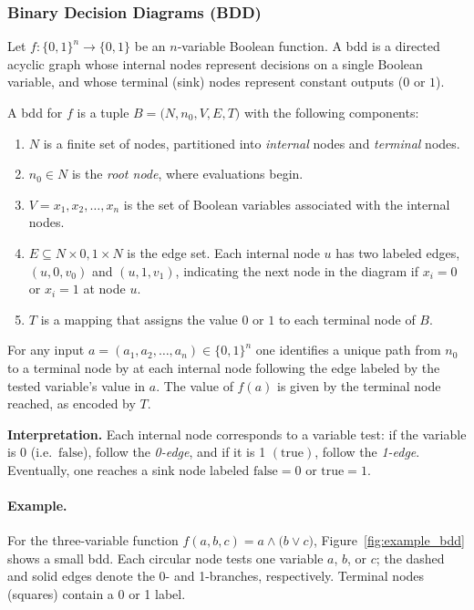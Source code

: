 \subsubsection{Binary Decision Diagrams (BDD)}
\label{sec:bdd}

Let $f: \{0,1\}^n \to \{0,1\}$ be an $n$-variable Boolean function. A \acrfull{bdd} is a directed acyclic graph whose internal nodes represent decisions on a single Boolean variable, and whose terminal (sink) nodes represent constant outputs ($0$ or $1$).

\begin{definition}
\label{def:bdd}
A \acrlong{bdd} for $f$ is a tuple $B =\bigl(N,n_0,V,E,T\bigr)$ with the following components:
\begin{enumerate}
\item $N$ is a finite set of nodes, partitioned into \emph{internal} nodes and \emph{terminal} nodes.
\item $n_0 \in N$ is the \emph{root node}, where evaluations begin.
\item $V={x_1,x_2,\dots,x_n}$ is the set of Boolean variables associated with the internal nodes.
\item $E \subseteq N \times {0,1} \times N$ is the edge set. Each internal node $u$ has two labeled edges, $(u,0,v_0)$ and $(u,1,v_1)$, indicating the next node in the diagram if $x_i=0$ or $x_i=1$ at node $u$.
\item $T$ is a mapping that assigns the value $0$ or $1$ to each terminal node of $B$.
\end{enumerate}
For any input $a = (a_1,a_2,\dots,a_n)\in\{0,1\}^n$ one identifies a unique path from $n_0$ to a terminal node by at each internal node following the edge labeled by the tested variable’s value in $a$. The value of $f(a)$ is given by the terminal node reached, as encoded by $T$.
\end{definition}

\noindent\textbf{Interpretation.} Each internal node corresponds to a variable test: if the variable is $0$ (i.e.\ $\text{false}$), follow the \emph{0-edge}, and if it is 1 $(\text{true})$, follow the \emph{1-edge}. Eventually, one reaches a sink node labeled $\text{false}=0$ or $\text{true}=1$.

\paragraph{Example.} For the three-variable function
$f(a,b,c)=a \land \bigl(b \lor c\bigr)$,
Figure~\ref{fig:example_bdd} shows a small \acrshort{bdd}. Each circular node tests one variable $a$, $b$, or $c$; the dashed and solid edges denote the 0- and 1-branches, respectively. Terminal nodes (squares) contain a 0 or 1 label.

